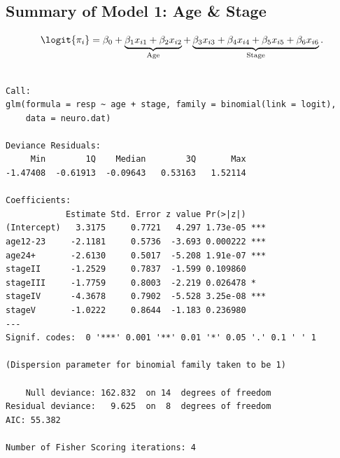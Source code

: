 \documentclass{article}\usepackage[]{graphicx}\usepackage[svgnames]{xcolor}
\makeatletter
\newenvironment{kframe}{%
 \def\at@end@of@kframe{}%
 \ifinner\ifhmode%
  \def\at@end@of@kframe{\end{minipage}}%
  \begin{minipage}{\columnwidth}%
 \fi\fi%
 \def\FrameCommand##1{\hskip\@totalleftmargin \hskip-\fboxsep
 \colorbox{shadecolor}{##1}\hskip-\fboxsep
     \hskip-\linewidth \hskip-\@totalleftmargin \hskip\columnwidth}%
 \MakeFramed {\advance\hsize-\width
   \@totalleftmargin\z@ \linewidth\hsize
   \@setminipage}}%
 {\par\unskip\endMakeFramed%
 \at@end@of@kframe}
\newenvironment{knitrout}{}{} %
\makeatother
\begin{document}
\subsection*{Summary of Model 1: Age \& Stage}
\[ \logit{\pi_i}=\beta_0+\underbrace{\beta_1x_{i1}+\beta_2x_{i2}}_{\text{Age}}+\underbrace{\beta_3x_{i3}+\beta_4x_{i4}+\beta_5x_{i5}+\beta_6x_{i6}}_{\text{Stage}}. \]
\begin{knitrout}
\color{fgcolor}\begin{kframe}
\begin{verbatim}

Call:
glm(formula = resp ~ age + stage, family = binomial(link = logit), 
    data = neuro.dat)

Deviance Residuals: 
     Min        1Q    Median        3Q       Max  
-1.47408  -0.61913  -0.09643   0.53163   1.52114  

Coefficients:
            Estimate Std. Error z value Pr(>|z|)    
(Intercept)   3.3175     0.7721   4.297 1.73e-05 ***
age12-23     -2.1181     0.5736  -3.693 0.000222 ***
age24+       -2.6130     0.5017  -5.208 1.91e-07 ***
stageII      -1.2529     0.7837  -1.599 0.109860    
stageIII     -1.7759     0.8003  -2.219 0.026478 *  
stageIV      -4.3678     0.7902  -5.528 3.25e-08 ***
stageV       -1.0222     0.8644  -1.183 0.236980    
---
Signif. codes:  0 '***' 0.001 '**' 0.01 '*' 0.05 '.' 0.1 ' ' 1

(Dispersion parameter for binomial family taken to be 1)

    Null deviance: 162.832  on 14  degrees of freedom
Residual deviance:   9.625  on  8  degrees of freedom
AIC: 55.382

Number of Fisher Scoring iterations: 4
\end{verbatim}
\end{kframe}
\end{knitrout}
\end{document}
